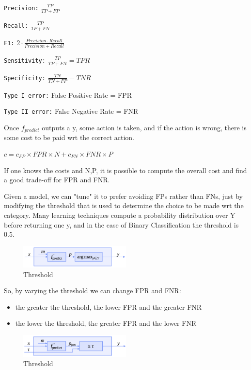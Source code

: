 \texttt{Precision:} $\frac{TP}{TP + FP}$

\texttt{Recall:} $\frac{TP}{TP + FN}$

\texttt{F1:} $2 \cdot \frac{Precision \cdot Recall}{Precision + Recall}$

\texttt{Sensitivity:} $\frac{TP}{TP + FN} = TPR$

\texttt{Specificity:} $\frac{TN}{TN + FP} = TNR$

\texttt{Type I error:} False Positive Rate = FPR 

\texttt{Type II error:} False Negative Rate = FNR

\begin{warningblock}
    Once $f_{predict}$ outputs a y, some action is taken, and if the action is wrong, there is some cost to be paid wrt the correct action.

    $c = c_{FP} \times FPR \times N + c_{FN} \times FNR \times P$

    If one knows the costs and N,P, it is possible to compute the overall cost and find a good trade-off for FPR and FNR.
\end{warningblock}

Given a model, we can "tune" it to prefer avoiding FPs rather than FNs, just by modifying the threshold that is used to determine the choice to be made wrt the category.
Many learning techniques compute a probability distribution over Y before returning one y, and in the case of Binary Classification the threshold is 0.5. 

\begin{figure}[H]
    \centering
    \includegraphics[width=0.5\textwidth]{assets/fig6.png}
    \caption{Threshold}
\end{figure}

So, by varying the threshold we can change FPR and FNR:
\begin{itemize}
    \item the greater the threshold, the lower FPR and the greater FNR
    \item the lower the threshold, the greater FPR and the lower FNR
\end{itemize}

\begin{figure}[H]
    \centering
    \includegraphics[width=0.5\textwidth]{assets/fig7.png}
    \caption{Threshold}
\end{figure}

